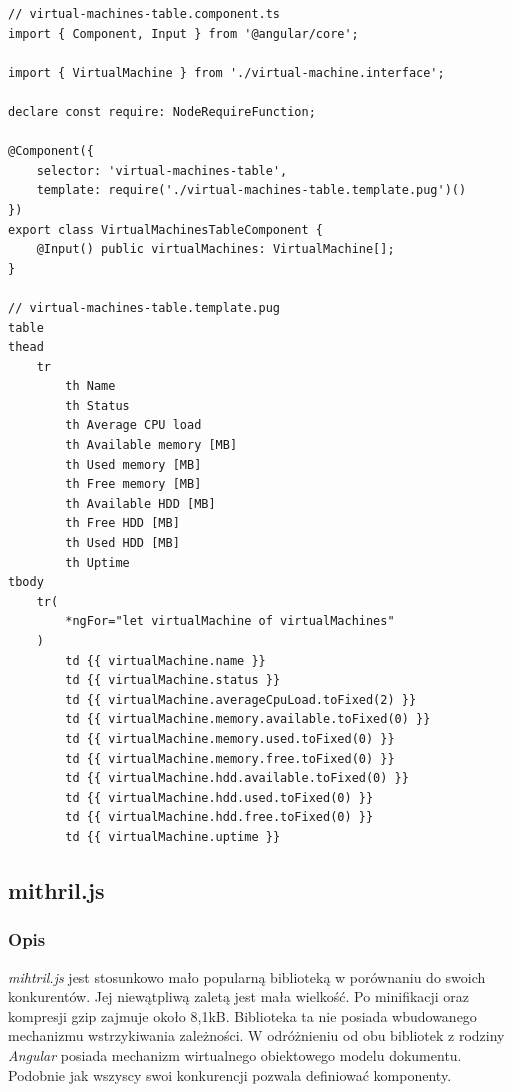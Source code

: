 \documentclass[polish, twoside, 12pt]{mwart}
\begin{document}
\begin{lstlisting}[caption=Komponent tabeli, label={lst:angular-table}]
// virtual-machines-table.component.ts
import { Component, Input } from '@angular/core';

import { VirtualMachine } from './virtual-machine.interface';

declare const require: NodeRequireFunction;

@Component({
    selector: 'virtual-machines-table',
    template: require('./virtual-machines-table.template.pug')()
})
export class VirtualMachinesTableComponent {
    @Input() public virtualMachines: VirtualMachine[];
}

// virtual-machines-table.template.pug
table
thead
    tr
        th Name
        th Status
        th Average CPU load
        th Available memory [MB]
        th Used memory [MB]
        th Free memory [MB]
        th Available HDD [MB]
        th Free HDD [MB]
        th Used HDD [MB]
        th Uptime
tbody
    tr(
        *ngFor="let virtualMachine of virtualMachines"
    )
        td {{ virtualMachine.name }}
        td {{ virtualMachine.status }}
        td {{ virtualMachine.averageCpuLoad.toFixed(2) }}
        td {{ virtualMachine.memory.available.toFixed(0) }}
        td {{ virtualMachine.memory.used.toFixed(0) }}
        td {{ virtualMachine.memory.free.toFixed(0) }}
        td {{ virtualMachine.hdd.available.toFixed(0) }}
        td {{ virtualMachine.hdd.used.toFixed(0) }}
        td {{ virtualMachine.hdd.free.toFixed(0) }}
        td {{ virtualMachine.uptime }}
\end{lstlisting}

\subsection{mithril.js}

\subsubsection{Opis}

\emph{mihtril.js} \cite{mithril.js} jest stosunkowo mało popularną biblioteką w porównaniu do swoich konkurentów. Jej niewątpliwą zaletą jest mała wielkość. Po minifikacji oraz kompresji gzip zajmuje około 8,1kB. Biblioteka ta nie posiada wbudowanego mechanizmu wstrzykiwania zależności. W odróżnieniu od obu bibliotek z rodziny \emph{Angular} posiada mechanizm wirtualnego obiektowego modelu dokumentu. Podobnie jak wszyscy swoi konkurencji pozwala definiować komponenty.
\end{document}
